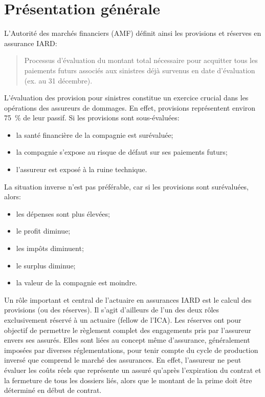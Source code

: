 
\chapter{Présentation générale}
\label{chap:presentation}

L'Autorité des marchés financiers (AMF) définit ainsi les provisions
et réserves en assurance IARD:
\begin{quote}
  Processus d'évaluation du montant total nécessaire pour
  acquitter tous les paiements futurs associés aux sinistres déjà
  survenus en date d'évaluation (ex. au 31 décembre).
\end{quote}

L'évaluation des provision pour sinistres constitue un exercice
crucial dans les opérations des assureurs de dommages. En effet,
provisions représentent environ 75~\% de leur passif. Si les
provisions sont sous-évaluées:
\begin{itemize}
\item la santé financière de la compagnie est surévaluée;
\item la compagnie s'expose au risque de défaut sur ses paiements
  futurs;
\item l'assureur est exposé à la ruine technique.
\end{itemize}
La situation inverse n'est pas préférable, car si les provisions sont
surévaluées, alors:
\begin{itemize}
\item les dépenses sont plus élevées;
\item le profit diminue;
\item les impôts diminuent;
\item le surplus diminue;
\item la valeur de la compagnie est moindre.
\end{itemize}

Un rôle important et central de l'actuaire en assurances IARD est le
calcul des provisions (ou des réserves). Il s'agit d'ailleurs de l'un
des deux rôles exclusivement réservé à un actuaire (fellow de l'ICA).
Les réserves ont pour objectif de permettre le règlement complet des
engagements pris par l'assureur envers ses assurés. Elles sont liées
au concept même d'assurance, généralement imposées par diverses
réglementations, pour tenir compte du cycle de production inversé que
comprend le marché des assurances. En effet, l'assureur ne peut
évaluer les coûts réels que représente un assuré qu'après l'expiration
du contrat et la fermeture de tous les dossiers liés, alors que le
montant de la prime doit être déterminé en début de contrat.

